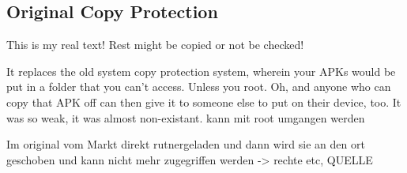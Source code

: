 \subsection{Original Copy Protection} \label{subsection:android-copy}
This is my real text! Rest might be copied or not be checked!


 It replaces the old system copy protection system, wherein your APKs would be put in a folder that you can't access. Unless you root. Oh, and anyone who can copy that APK off can then give it to someone else to put on their device, too. It was so weak, it was almost non-existant.\newline
 kann mit root umgangen werden


Im original vom Markt direkt rutnergeladen und dann wird sie an den ort geschoben und kann nicht mehr zugegriffen werden -> rechte etc, QUELLE\newline
